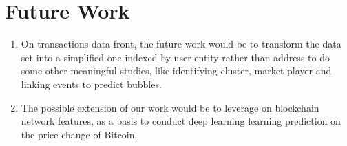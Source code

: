 \section{Future Work}

\begin{enumerate}

\item On transactions data front, the future work would be to transform the data set into a simplified one indexed by user entity rather than
address to do some other meaningful studies, like identifying cluster, market player and linking events to predict bubbles.

\item  The possible extension of our work would be to leverage on blockchain network features, as a basis to conduct deep learning learning
prediction on the price change of Bitcoin.

\end{enumerate}
